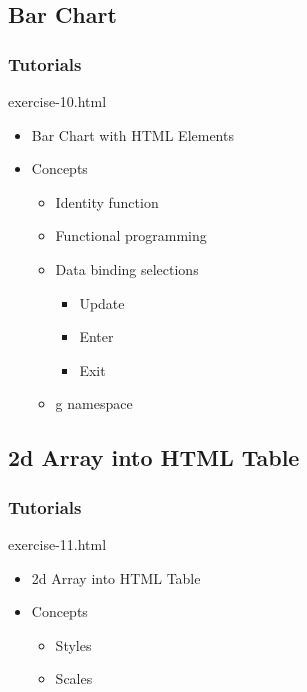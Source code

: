 \documentclass{beamer}
\begin{document}
\subsection{Bar Chart}

\begin{frame}
    \frametitle{Tutorials}
    \begin{block}{exercise-10.html}
        \begin{itemize}
            \pause
            \item Bar Chart with HTML Elements
            \pause
            \item Concepts
            \begin{itemize}
                \pause
                \item Identity function
                \pause
                \item Functional programming
                \pause
                \item Data binding selections
                \begin{itemize}
                    \pause
                    \item Update
                    \pause
                    \item Enter
                    \pause
                    \item Exit
                \end{itemize}
                \pause
                \item g namespace
            \end{itemize}
        \end{itemize}
    \end{block}
\end{frame}


\subsection{2d Array into HTML Table}

\begin{frame}
    \frametitle{Tutorials}
    \begin{block}{exercise-11.html}
        \pause
        \begin{itemize}
        \pause
        \item 2d Array into HTML Table
        \pause
        \item Concepts
            \begin{itemize}
                \item Styles
                \item Scales
            \end{itemize}
        \end{itemize}
    \end{block}
\end{frame}
\end{document}
